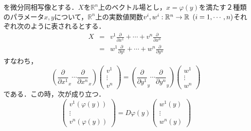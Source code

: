 \documentclass[uplatex, 12pt, dvipdfmx]{jsarticle}
\begin{document}
\begin{theorem}
    を微分同相写像とする．$X$を$\mathbb{R}^n$上のベクトル場とし，$x=\varphi(y)$を満たす２種類のパラメータ$x,y$について，$\mathbb{R}^n$上の実数値関数$v^i,w^i:\mathbb{R}^n\to\mathbb{R}\hspace{0.5em}(i=1,\cdots,n)$それぞれ次のように表されるとする．
    \begin{eqnarray*}
        X &=& v^1\frac{\partial}{\partial x^1}+\cdots +v^n\frac{\partial}{\partial x^n} \\
        &=& w^1\frac{\partial}{\partial y^1}+\cdots +w^n\frac{\partial}{\partial y^n}
    \end{eqnarray*}
    すなわち，\begin{equation}
        \left( \frac{\partial}{\partial x^1}_x\cdots \frac{\partial}{\partial x^n}_x \right) \left( \begin{array}{c}
            v^1 \\ \vdots \\ v^n
        \end{array} \right) = \left( \frac{\partial}{\partial y^1}_y\cdots \frac{\partial}{\partial y^n}_y \right) \left( \begin{array}{c}
            w^1 \\ \vdots \\ w^n
        \end{array} \right)
    \label{equation-change-of-basis}\end{equation}である．この時，次が成り立つ．
    \[ \left( \begin{array}{c}
        v^1(\varphi(y)) \\ \vdots \\ v^n(\varphi(y))
    \end{array} \right) = D\varphi(y) \left( \begin{array}{c}
        w^1(y) \\ \vdots \\ w^n(y)
    \end{array} \right) \]
\end{theorem}
\end{document}
